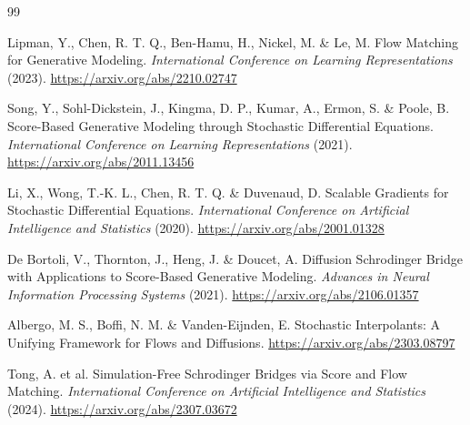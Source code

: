 \documentclass[11pt]{article}
\begin{document}
\begin{thebibliography}{99}

Lipman, Y., Chen, R. T. Q., Ben-Hamu, H., Nickel, M. \& Le, M.
Flow Matching for Generative Modeling.
\textit{International Conference on Learning Representations} (2023).
\url{https://arxiv.org/abs/2210.02747}

Song, Y., Sohl-Dickstein, J., Kingma, D. P., Kumar, A., Ermon, S. \& Poole, B.
Score-Based Generative Modeling through Stochastic Differential Equations.
\textit{International Conference on Learning Representations} (2021).
\url{https://arxiv.org/abs/2011.13456}

Li, X., Wong, T.-K. L., Chen, R. T. Q. \& Duvenaud, D.
Scalable Gradients for Stochastic Differential Equations.
\textit{International Conference on Artificial Intelligence and Statistics} (2020).
\url{https://arxiv.org/abs/2001.01328}

De Bortoli, V., Thornton, J., Heng, J. \& Doucet, A.
Diffusion Schrodinger Bridge with Applications to Score-Based Generative Modeling.
\textit{Advances in Neural Information Processing Systems} (2021).
\url{https://arxiv.org/abs/2106.01357}

Albergo, M. S., Boffi, N. M. \& Vanden-Eijnden, E.
Stochastic Interpolants: A Unifying Framework for Flows and Diffusions.
\url{https://arxiv.org/abs/2303.08797}

Tong, A. et al.
Simulation-Free Schrodinger Bridges via Score and Flow Matching.
\textit{International Conference on Artificial Intelligence and Statistics} (2024).
\url{https://arxiv.org/abs/2307.03672}

\end{thebibliography}
\end{document}
